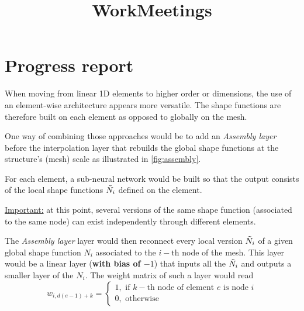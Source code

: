 \documentclass{article}
\title{WorkMeetings}
\date{}
\author{}
\begin{document}
\maketitle


\section{Progress report}

When moving from linear 1D elements to higher order or dimensions, the use of an element-wise architecture \parencite{liu_hidenn-fem_2023} appears more versatile. The shape functions are therefore built on each element as opposed to globally on the mesh. 

One way of combining those approaches would be to add an \emph{Assembly layer} before the interpolation layer that rebuilds the global shape functions at the structure's (mesh) scale as illustrated in \cref{fig:assembly}.

For each element, a sub-neural network would be built so that the output consists of the local shape functions $\Tilde{N}_i$ defined on the element. 

\underline{Important:} at this point, several versions of the same shape function (associated to the same node) can exist independently through different elements.

The \emph{Assembly layer} layer would then reconnect every local version $\Tilde{N}_i$ of a given global shape function $N_i$ associated to the $i-\text{th}$ node of the mesh. This layer would be a linear layer (\textbf{with bias of $-1$}) that inputs all the $\Tilde{N}_i$ and outputs a smaller layer of the $N_i$.
The weight matrix of such a layer would read
\begin{equation}
    w_{i,d\left(e-1\right)+k} = \begin{cases}
        1,\text{ if }k-\text{th node of element }e\text{ is node }i \\
        0,\text{ otherwise}
    \end{cases}
\end{equation}
\end{document}
